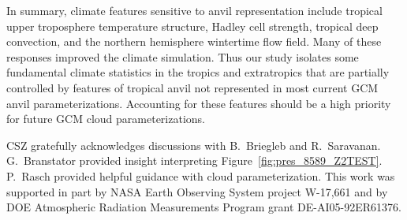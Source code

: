 \documentclass[twoside,agupp]{aguplus}
\begin{document}
In summary, climate features sensitive to anvil representation include
tropical upper troposphere temperature structure, Hadley cell
strength, tropical deep convection, and the northern hemisphere
wintertime flow field.   
Many of these responses improved the climate simulation.
Thus our study isolates some fundamental climate statistics in the 
tropics and extratropics that are partially controlled by features of
tropical anvil not represented in most current GCM anvil
parameterizations.   
Accounting for these features should be a high priority for future GCM
cloud parameterizations.

\balance


\acknowledgments
CSZ gratefully acknowledges discussions with B.~Briegleb and
R.~Saravanan.
G.~Branstator provided insight interpreting
Figure~\ref{fig:pres_8589_Z2TEST}.   
P.~Rasch provided helpful guidance with cloud parameterization. 
This work was supported in part by NASA Earth Observing System project
W-17,661 and by DOE Atmospheric Radiation Measurements Program grant
DE-AI05-92ER61376.



\end{document}
